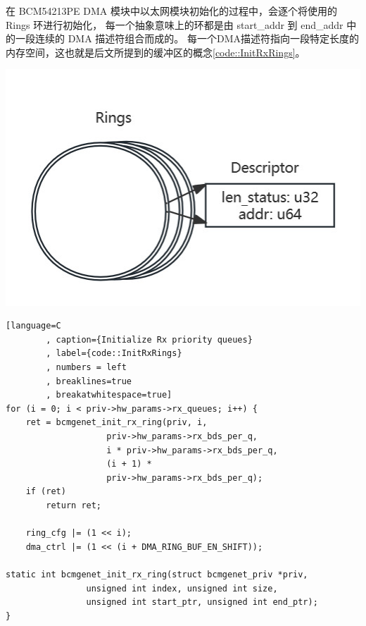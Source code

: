     \begin{adjustwidth}{0cm}{} %
    \begin{minipage}[b]{0.5\linewidth}
        \setlength{\parindent}{2em} %
        在 BCM54213PE DMA 模块中以太网模块初始化的过程中，会逐个将使用的 Rings 环进行初始化，
        每一个抽象意味上的环都是由 start\_addr 到 end\_addr 中的一段连续的 DMA 描述符组合而成的。
        每一个DMA描述符指向一段特定长度的内存空间，这也就是后文所提到的缓冲区的概念\ref{code::InitRxRings}。

    \end{minipage}
    \hfill
    \begin{minipage}[b]{0.45\linewidth}
        \includegraphics[scale=0.4]{./imgs/Rings_and_Descs.jpg}        
    \end{minipage}
    \end{adjustwidth}

    \newpage
    \begin{lstlisting}[language=C
        , caption={Initialize Rx priority queues}
        , label={code::InitRxRings}
        , numbers = left
        , breaklines=true
        , breakatwhitespace=true]
for (i = 0; i < priv->hw_params->rx_queues; i++) {
    ret = bcmgenet_init_rx_ring(priv, i,
                    priv->hw_params->rx_bds_per_q,
                    i * priv->hw_params->rx_bds_per_q,
                    (i + 1) *
                    priv->hw_params->rx_bds_per_q);
    if (ret)
        return ret;

    ring_cfg |= (1 << i);
    dma_ctrl |= (1 << (i + DMA_RING_BUF_EN_SHIFT));

static int bcmgenet_init_rx_ring(struct bcmgenet_priv *priv,
                unsigned int index, unsigned int size,
                unsigned int start_ptr, unsigned int end_ptr);
}
    \end{lstlisting}

